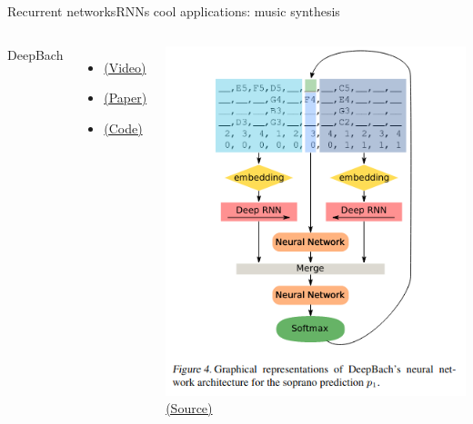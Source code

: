 \documentclass[10pt,compress]{beamer} %
\begin{document}
\begin{frame}{Recurrent networks}{RNNs cool applications: music synthesis} 
    \begin{columns}
	DeepBach
    \begin{itemize}
        \item \href{https://www.youtube.com/watch?v=QiBM7-5hA6o}{(Video)}
        \item \href{http://proceedings.mlr.press/v70/hadjeres17a/hadjeres17a.pdf}{(Paper)}
        \item \href{https://github.com/Ghadjeres/DeepBach}{(Code)}
    \end{itemize}
            \centering \includegraphics[width=\textwidth]{figs/bach.png}\\
	        \scriptsize\href{http://proceedings.mlr.press/v70/hadjeres17a/hadjeres17a.pdf}{(Source)}
    \end{columns}
\end{frame}
\end{document}
